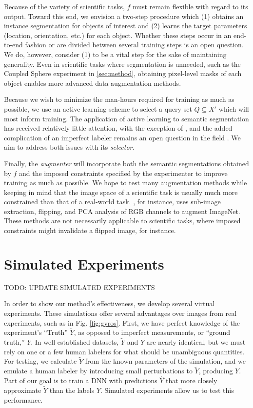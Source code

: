 \documentclass[10pt, journal]{IEEEtran}
\begin{document}
Because of the variety of scientific tasks, $f$ must remain flexible with regard
to its output. Toward this end, we envision a two-step procedure which (1)
obtains an instance segmentation \cite{ronneberger_u-net:_2015, bai_deep_2016}
for objects of interest and (2) learns the target parameters (location,
orientation, etc.) for each object. Whether these steps occur in an end-to-end
fashion or are divided between several training steps is an open question. We
do, however, consider (1) to be a vital step for the sake of maintaining
generality. Even in scientific tasks where segmentation is unneeded, such as the
Coupled Sphere experiment in \ref{sec:method}, obtaining pixel-level masks of
each object enables more advanced data augmentation methods.

Because we wish to minimize the man-hours required for training as much as
possible, we use an active learning scheme to select a query set
$Q \subseteq X'$ which will most inform training. The application of active
learning to semantic segmentation has received relatively little attention, with
the exception of \cite{vezhnevets_active_2012}, and the added complication of an
imperfect labeler remains an open question in the field
\cite{settles_active_2012}. We aim to address both issues with its
\emph{selector}.

Finally, the \emph{augmenter} will incorporate both the semantic segmentations
obtained by $f$ and the imposed constraints specified by the experimenter to
improve training as much as possible. We hope to test many augmentation methods
while keeping in mind that the image space of a scientific task is usually much
more constrained than that of a real-world
task. \cite{krizhevsky_imagenet_2012}, for instance, uses sub-image extraction,
flipping, and PCA analysis of RGB channels to augment ImageNet. These methods
are not necessarily applicable to scientific tasks, where imposed constraints
might invalidate a flipped image, for instance.

\section{Simulated Experiments}
\label{sec:simulated-experiments}

TODO: UPDATE SIMULATED EXPERIMENTS

In order to show our method's effectiveness, we develop several virtual
experiments. These simulations offer several advantages over images from real
experiments, such as in Fig. \ref{fig:gyros}. First, we have perfect knowledge
of the experiment's ``Truth'' $\tilde{Y}$, as opposed to imperfect measurements,
or ``ground truth,'' $Y$. In well established datasets, $\tilde{Y}$ and $Y$ are
nearly identical, but we must rely on one or a few human labelers for what
should be unambiguous quantities. For testing, we calculate $\tilde{Y}$ from the
known parameters of the simulation, and we emulate a human labeler by
introducing small perturbations to $\tilde{Y}$, producing $Y$. Part of
our goal is to train a DNN with predictions $\hat{Y}$ that more closely
approximate $\tilde{Y}$ than the labels $Y$. Simulated experiments allow us to
test this performance.
\end{document}
